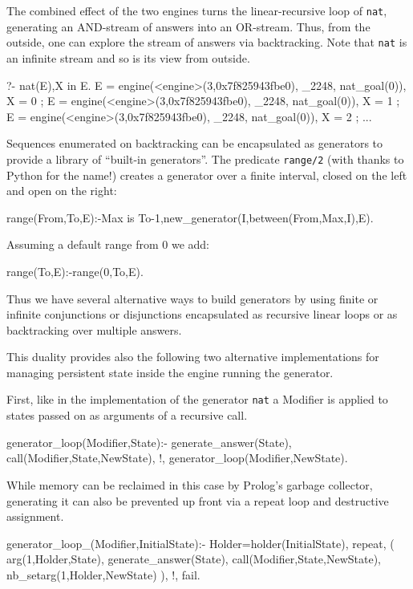 \documentclass{new_tlp}
\begin{document}
\BX
The combined effect of the two engines turns the linear-recursive loop of {\tt nat},
generating an AND-stream of answers into an OR-stream. Thus, from the outside, one can explore the stream of answers via backtracking. 
Note that {\tt nat} is an infinite stream and so is its
view from outside.
\begin{codex}
?- nat(E),X in E.
E = engine(<engine>(3,0x7f825943fbe0), _2248, nat_goal(0)),
X = 0 ;
E = engine(<engine>(3,0x7f825943fbe0), _2248, nat_goal(0)),
X = 1 ;
E = engine(<engine>(3,0x7f825943fbe0), _2248, nat_goal(0)),
X = 2 ;
...
\end{codex}
\EX

Sequences enumerated on backtracking can be encapsulated as generators to provide a library of ``built-in generators''.
The predicate {\tt range/2} (with thanks to Python for the name!) creates a generator over a finite interval, closed on the left and open on the right:
\begin{code}
range(From,To,E):-Max is To-1,new_generator(I,between(From,Max,I),E).
\end{code}
Assuming a  default range from 0 we add:
\begin{code}
range(To,E):-range(0,To,E).
\end{code}

Thus we have several alternative ways to build generators by using finite or infinite conjunctions or disjunctions encapsulated as recursive linear loops or as backtracking over multiple answers.

This duality provides also the following two alternative implementations
for managing persistent state inside the engine running the generator.

First, like in the implementation of the generator {\tt nat} a Modifier
is applied to states passed on as arguments of a recursive call. 
\begin{code}
generator_loop(Modifier,State):-
  generate_answer(State),
  call(Modifier,State,NewState),
  !,
  generator_loop(Modifier,NewState).
\end{code}
While memory can be reclaimed in this case by Prolog's garbage collector,
generating it can also be prevented up front via a repeat loop and destructive assignment.
\begin{code}
generator_loop_(Modifier,InitialState):-
  Holder=holder(InitialState),
  repeat,
    \+ (
      arg(1,Holder,State),
      generate_answer(State),
      call(Modifier,State,NewState),
      nb_setarg(1,Holder,NewState)
    ),
  !,
  fail.
\end{code}
\end{document}
